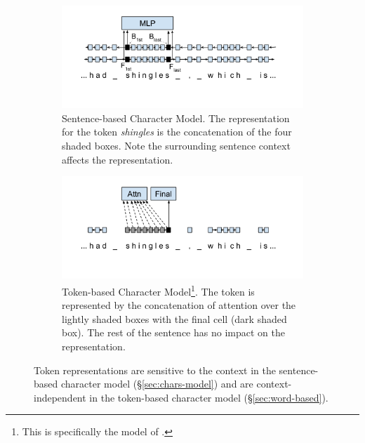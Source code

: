 \documentclass[11pt,a4paper]{article}
\begin{document}
\label{sec:chars-model}
\begin{figure}
\centering
\begin{subfigure}[t]{0.47\textwidth}
    \includegraphics[width=\textwidth]{CharacterModel.png}
    \vspace{-0.5in}
    \caption{Sentence-based Character Model.  The representation for the token \emph{shingles} is the concatenation of the four shaded boxes.  Note the surrounding sentence context affects the representation.}
    \label{fig:charmodel}
\end{subfigure}
\hspace{.3cm}
\begin{subfigure}[t]{0.47\textwidth}
\includegraphics[width=\textwidth]{TokenCharacterModel.png}
\vspace{-0.5in}
\caption{Token-based Character Model\footnote{This is specifically the model of .}.  The token is represented by the concatenation of attention over the lightly shaded boxes with the final cell (dark shaded box).  The rest of the sentence has no impact on the representation.}
\label{fig:tokencharmodel}
\end{subfigure}
\caption{Token representations
are sensitive to the context
in the sentence-based character model (\S\ref{sec:chars-model})
and are context-independent
in the token-based character model (\S\ref{sec:word-based}).}
\label{fig:comparingcharmodels}
\end{figure}
\end{document}
